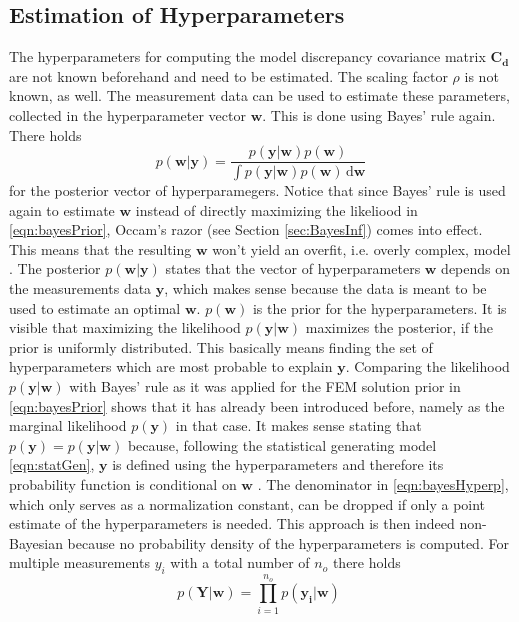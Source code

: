 \documentclass[%
  a4paper,oneside,%
  11pt,%
  smallchapters,
  style=printdev,
  extramargin,
  green,%
  rgb, <cmyk>
  ]{tubsbook}
\begin{document}
\subsection{Estimation of Hyperparameters }
\label{sec:HyperParEst}
The hyperparameters for computing the model discrepancy covariance matrix $\bm{C_d}$ are not known beforehand and need to be estimated. The scaling factor $\rho$ is not known, as well. The measurement data can be used to estimate these parameters, collected in the hyperparameter vector $\bm{w}$. This is done using Bayes' rule again. There holds
%
\begin{equation}
p(\bm{w}|\bm{y}) = \frac{p(\bm{y}|\bm{w}) p(\bm{w})}{\int p(\bm{y}|\bm{w}) p(\bm{w}) \, \mathrm{d}\bm{w}}
\label{eqn:bayesHyperp}
\end{equation}
%
for the posterior vector of hyperparamegers. Notice that since Bayes' rule is used again to estimate $\bm{w}$ instead of directly maximizing the likeliood in \eqref{eqn:bayesPrior}, Occam's razor (see Section \ref{sec:BayesInf}) comes into effect. This means that the resulting $\bm{w}$ won't yield an overfit, i.e. overly complex, model \cite{girolami2021,MacKay1991}. The posterior $p(\bm{w}|\bm{y})$ states that the vector of hyperparameters $\bm{w}$ depends on the measurements data $\bm{y}$, which makes sense because the data is meant to be used to estimate an optimal $\bm{w}$. $p(\bm{w})$ is the prior for the hyperparameters. It is visible that maximizing the likelihood $p(\bm{y}|\bm{w})$ maximizes the posterior, if the prior is uniformly distributed. This basically means finding the set of hyperparameters which are most probable to explain $\bm{y}$. Comparing the likelihood $p(\bm{y}|\bm{w})$ with Bayes' rule as it was applied for the FEM solution prior in \eqref{eqn:bayesPrior} shows that it has already been introduced before, namely as the marginal likelihood $p(\bm{y})$ in that case. It makes sense stating that $p(\bm{y}) = p(\bm{y}|\bm{w})$ because, following the statistical generating model \eqref{eqn:statGen}, $\bm{y}$ is defined using the hyperparameters and therefore its probability function is conditional on $\bm{w}$ \cite[p.12]{girolami2021}. 
The denominator in \ref{eqn:bayesHyperp}, which only serves as a normalization constant, can be dropped if only a point estimate of the hyperparameters is needed. This approach is then indeed non-Bayesian because no probability density of the hyperparameters is computed.
For multiple measurements $y_i$ with a total number of $n_o$ there holds
\begin{equation}
p(\bm{Y}|\bm{w}) = \prod_{i=1}^{n_o} p(\bm{y_i}|\bm{w}) \; 
\label{eqn:MultipleObs}
\end{equation}
\end{document}
